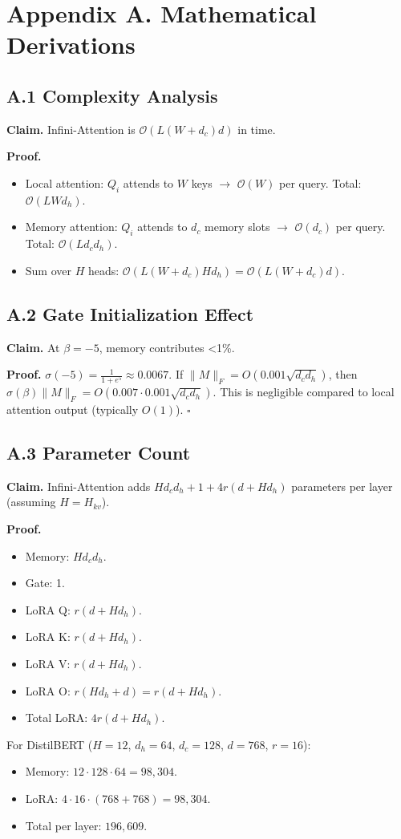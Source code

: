 
\section{Appendix A. Mathematical Derivations}

\subsection{A.1 Complexity Analysis}

\textbf{Claim.} Infini-Attention is $\mathcal{O}(L(W + d_c) d)$ in time.

\textbf{Proof.} 
\begin{itemize}
\item Local attention: $Q_i$ attends to $W$ keys $\to$ $\mathcal{O}(W)$ per query.
  Total: $\mathcal{O}(L W d_h)$.
\item Memory attention: $Q_i$ attends to $d_c$ memory slots $\to$ $\mathcal{O}(d_c)$
  per query. Total: $\mathcal{O}(L d_c d_h)$.
\item Sum over $H$ heads: $\mathcal{O}(L(W + d_c) H d_h) = \mathcal{O}(L(W + d_c) d)$.

\end{itemize}
\subsection{A.2 Gate Initialization Effect}

\textbf{Claim.} At $\beta = -5$, memory contributes <1\%.

\textbf{Proof.} $\sigma(-5) = \frac{1}{1 + e^5} \approx 0.0067$. If $\|M\|_F = O(0.001 \sqrt{d_c d_h})$, 
then $\sigma(\beta) \|M\|_F = O(0.007 \cdot 0.001 \sqrt{d_c d_h})$. This is 
negligible compared to local attention output (typically $O(1)$). $\square$

\subsection{A.3 Parameter Count}

\textbf{Claim.} Infini-Attention adds $H d_c d_h + 1 + 4 r(d + H d_h)$ parameters 
per layer (assuming $H = H_{kv}$).

\textbf{Proof.} 
\begin{itemize}
\item Memory: $H d_c d_h$.
\item Gate: 1.
\item LoRA Q: $r(d + H d_h)$.
\item LoRA K: $r(d + H d_h)$.
\item LoRA V: $r(d + H d_h)$.
\item LoRA O: $r(H d_h + d) = r(d + H d_h)$.
\item Total LoRA: $4 r(d + H d_h)$.

\end{itemize}
For DistilBERT ($H = 12$, $d_h = 64$, $d_c = 128$, $d = 768$, $r = 16$):
\begin{itemize}
\item Memory: $12 \cdot 128 \cdot 64 = 98,304$.
\item LoRA: $4 \cdot 16 \cdot (768 + 768) = 98,304$.
\item Total per layer: $196,609$.

\end{itemize}
